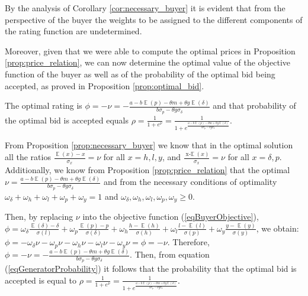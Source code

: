 \documentclass[informs]{informs3}
\begin{document}
By the analysis of Corollary \ref{cor:necessary_buyer} it is evident that from the perspective of the buyer the weights to be assigned to the different components of the rating function are undetermined. 

Moreover, given that we were able to compute the optimal prices in Proposition  \ref{prop:price_relation}, we can now determine the optimal value of the objective function of the buyer as well as of the probability of the optimal bid being accepted, as proved in Proposition \ref{prop:optimal_bid}.



\begin{proposition}\label{prop:optimal_bid}
The optimal rating is $\phi=-\nu =-\frac{a-b \mathop{\mathbb{E}}\left(p\right)-\theta m+\theta g \mathop{\mathbb{E}}\left(\delta\right)}{b\sigma_{p}-\theta g\sigma_{\delta}}$ and that probability of the optimal bid is accepted equals $\rho=\frac{1}{1+e^{\nu}}=\frac{1}{1+e^{\frac{a-b \mathop{\mathbb{E}}\left(p\right)-\theta m+\theta g \mathop{\mathbb{E}}\left(\delta\right)}{b\sigma_{p}-\theta g\sigma_{\delta}}  }}$.

\end{proposition}
%
From Proposition \ref{prop:necessary_buyer} we know that in the optimal solution all the ratios $\frac{\mathop{\mathbb{E}}\left(x\right)-x}{\sigma_{x}} = \nu$ for all $x = {h, l, y}$, and $\frac{\mathop{x-\mathbb{E}}\left(x\right)}{\sigma_{x}} = \nu$ for all $x = {\delta, p}$. Additionally, we know from Proposition \ref{prop:price_relation} that the optimal $\nu =\frac{a-b \mathop{\mathbb{E}}\left(p\right)-\theta m+\theta g \mathop{\mathbb{E}}\left(\delta\right)}{b\sigma_{p}-\theta g\sigma_{\delta}}$ and from the necessary conditions of optimality 
$\omega_{\delta}+\omega_{h}+\omega_{l}+\omega_{p}+\omega_{y}=1 $ and 		
$\omega_{\delta},\omega_{h},\omega_{l},\omega_{p},\omega_{y} \geq 0$. 

Then, by replacing $\nu$ into the objective function (\ref{eqBuyerObjective}), 
$\phi=\omega_{\delta}\frac{\mathop{\mathbb{E}}\left(\delta\right)-\delta }
{\sigma\left(l\right)}+\omega_{p}\frac{\mathop{\mathbb{E}}\left(p\right)-p}  {\sigma\left(\delta\right)} 
+\omega_{h}\frac{ h-\mathop{\mathbb{E}}\left(h\right)}
{\sigma\left(h\right)}+\omega_{l}\frac{ l-\mathop{\mathbb{E}}\left(l\right) }{\sigma\left(p\right)}+\omega_{y}\frac{y-\mathop{\mathbb{E}}\left(y\right)}{\sigma\left(y\right)}$, we obtain:
$\phi=-\omega_{\delta}\nu-\omega_{p}\nu 
-\omega_{h}\nu-\omega_{l}\nu-\omega_{y}\nu = \phi=-\nu$. Therefore, 
$\phi=-\nu =-\frac{a-b \mathop{\mathbb{E}}\left(p\right)-\theta m+\theta g \mathop{\mathbb{E}}\left(\delta\right)}{b\sigma_{p}-\theta g\sigma_{\delta}}$.  Then, from equation (\ref{eqGeneratorProbability}) it follows that the probability that the optimal bid is accepted is equal to  
$\rho=\frac{1}{1+e^{\nu}}=\frac{1}{1+e^{\frac{a-b \mathop{\mathbb{E}}\left(p\right)-\theta m+\theta g \mathop{\mathbb{E}}\left(\delta\right)}{b\sigma_{p}-\theta g\sigma_{\delta}}  }}$.\Halmos
\endproof
\end{document}
